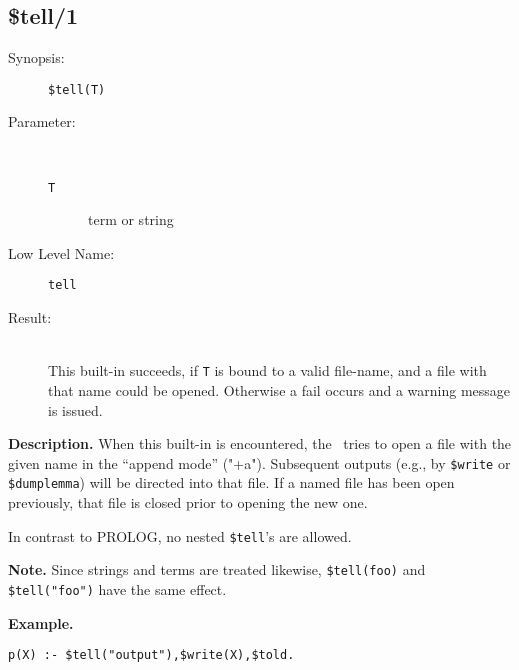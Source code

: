 %
%
%
\subsection{\$tell/1}\label{sec:tell}

\begin{description}
\item[Synopsis:]
        {\tt \$tell(T)}
\item[Parameter:]\ \\[-0.5cm]
        \begin{description}
        \item[{\tt T}] term or string
        \end{description}
\item[Low Level Name:]
        {\tt tell}
\item[Result:]\ \\
This built-in succeeds, if {\tt T} is bound to a valid file-name, and a
file with that name could be opened. Otherwise a fail occurs and a
warning message is issued.
\end{description}

\vspace*{0.5cm}
\noindent
{\bf Description.}
When this built-in is encountered, the \SAM\ tries to open a file
with the given name in the ``append mode'' ("+a"). 
Subsequent outputs (e.g., by
{\tt \$write} or {\tt \$dumplemma}) will be directed into that file.
If a named file has been open previously, that file is closed prior
to opening the new one.

In contrast to PROLOG, no nested {\tt \$tell}'s are allowed.

\vspace*{0.5cm}
\noindent
{\bf Note.}
Since strings and terms are treated likewise, {\tt \$tell(foo)} and
{\tt \$tell("foo")} have the same effect.

\vspace*{0.5cm}
\noindent
{\bf Example.}
\begin{verbatim}
p(X) :- $tell("output"),$write(X),$told.
\end{verbatim}


